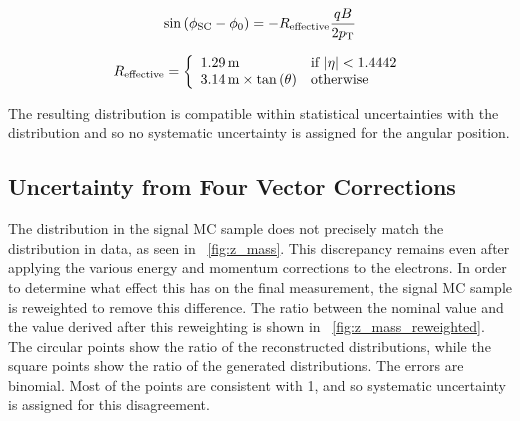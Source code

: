 \begin{equation}\label{eq:b_field_correction}
    \sin \left( \phi_{\text{SC}} - \phi_{0} \right)
    =
    - R_{\text{effective}} \frac{q B}{2 p_{\mathrm{T}}}
\end{equation}

\begin{equation}\label{eq:effective_radius}
    R_{\text{effective}}
    =
    \left\{
        \begin{array}{ll}
            1.29 \text{\,m} & \text{if } |\eta| < 1.4442 \\
            3.14 \text{\,m} \times \tan \left(\theta\right) & \text{otherwise}
        \end{array}
    \right.
\end{equation}

The resulting \phistarSC distribution is compatible within statistical
uncertainties with the \phistar distribution and so no systematic uncertainty
is assigned for the angular position.


\subsection{Uncertainty from Four Vector Corrections}

The \mee distribution in the \MADGRAPH signal MC sample does not precisely
match the distribution in data, as seen in \FIG~\ref{fig:z_mass}. This
discrepancy remains even after applying the various energy and momentum
corrections to the electrons. In order to determine what effect this has on the
final measurement, the \MADGRAPH signal MC sample is reweighted to remove this
difference. The ratio between the nominal \phistar value and the value derived
after this reweighting is shown in \FIG~\ref{fig:z_mass_reweighted}. The
circular points show the ratio of the reconstructed \phistar distributions,
while the square points show the ratio of the generated \phistar distributions.
The errors are binomial. Most of the points are consistent with \num{1}, and so
systematic uncertainty is assigned for this disagreement.

